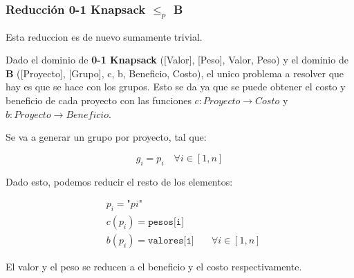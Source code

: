 \subsubsection*{Reducci\'on 0-1 Knapsack $\le_{p}$ B }

Esta reduccion es de nuevo sumamente trivial. 

Dado el dominio de \textbf{0-1 Knapsack} ([Valor], [Peso], Valor, Peso) y 
el dominio de \textbf{B} ([Proyecto], [Grupo], c, b, Beneficio, Costo), el unico 
problema a resolver que hay es que se hace con los grupos. Esto se da ya que 
se puede obtener el costo y beneficio de cada proyecto con las funciones 
$c: Proyecto \rightarrow Costo$ y 
$b: Proyecto \rightarrow Beneficio$.

Se va a generar un grupo por proyecto, tal que: 

\[
  g_i = {p_i} \quad \forall i \in [1, n]
\]

Dado esto, podemos reducir el resto de los elementos: 

\begin{align*}
  &p_i = \texttt{"$pi$"} &\\
  &c(p_i) = \texttt{pesos[i]} &\\
  &b(p_i) = \texttt{valores[i]} &\quad \forall i \in [1, n] 
\end{align*}

El valor y el peso se reducen a el beneficio y el costo respectivamente.

